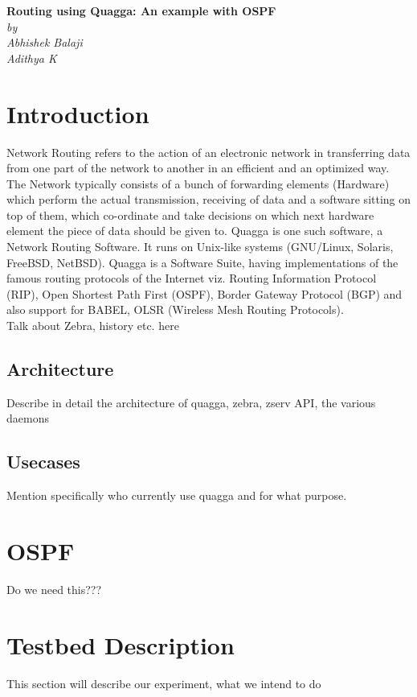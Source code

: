 \documentclass{article}
\begin{document}
\begin{titlepage}
\begin{center}
    \Large\textbf{Routing using Quagga: An example with OSPF}\\
    \textit{by}\\
    \large\textit{Abhishek Balaji \\ Adithya K}
\end{center}
\end{titlepage}
\tableofcontents
\clearpage
\section{Introduction}
Network Routing refers to the action of an electronic network in transferring data from one part of the network to another in an
efficient and an optimized way. The Network typically consists of a bunch of forwarding elements (Hardware) which perform the 
actual transmission, receiving of data and a software sitting on top of them, which co-ordinate and take decisions on
which next hardware element the piece of data should be given to. Quagga is one such software, a Network Routing Software.
It runs on Unix-like systems (GNU/Linux, Solaris, FreeBSD, NetBSD). Quagga is a Software Suite, having implementations of the famous 
routing protocols of the Internet viz. Routing Information Protocol (RIP), Open Shortest Path First (OSPF), Border Gateway Protocol (BGP)
and also support for BABEL, OLSR (Wireless Mesh Routing Protocols).\\
Talk about Zebra, history etc. here

\subsection{Architecture}
Describe in detail the architecture of quagga, zebra, zserv API, the various daemons
\subsection{Usecases}
Mention specifically who currently use quagga and for what purpose.
\clearpage
\section{OSPF}
Do we need this???
\clearpage
\section{Testbed Description}
This section will describe our experiment, what we intend to do
\end{document}

